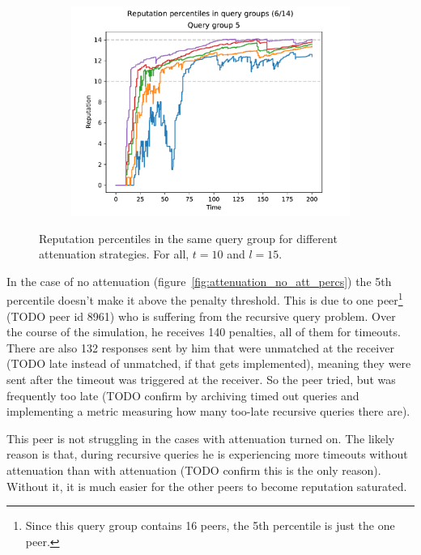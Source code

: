 \begin{figure}[t]
\begin{subfigure}[t]{0.45\columnwidth}
    \includegraphics[width=\columnwidth]{figures/attenuation_1_8_harmonic_rep_percs_6_of_14}
    \label{fig:attenuation_harmonic_percs}
  \end{subfigure}
  \caption{Reputation percentiles in the same query group for different
  attenuation strategies. For all, $t = 10$ and $l = 15$.}
  \label{fig:attenuation_percs}
\end{figure}

In the case of no attenuation (figure~\ref{fig:attenuation_no_att_percs}) the
5th percentile doesn't make it above the penalty threshold. This is due to one
peer\footnote{Since this query group contains 16 peers, the 5th percentile is
just the one peer.} (TODO peer id 8961) who is suffering from the recursive
query problem. Over the course of the simulation, he receives 140 penalties, all
of them for timeouts. There are also 132 responses sent by him that were
unmatched at the receiver (TODO late instead of unmatched, if that gets
implemented), meaning they were sent after the timeout was triggered at the
receiver. So the peer tried, but was frequently too late (TODO confirm by
archiving timed out queries and implementing a metric measuring how many
too-late recursive queries there are).

This peer is not struggling in the cases with attenuation turned on. The likely
reason is that, during recursive queries he is experiencing more timeouts
without attenuation than with attenuation (TODO confirm this is the only
reason). Without it, it is much easier for the other peers to become reputation
saturated.

